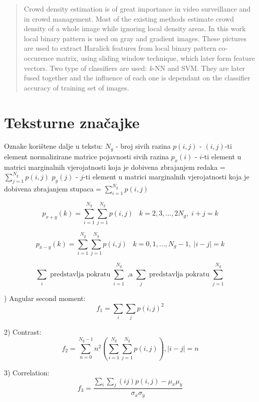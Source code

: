 \documentclass[times, utf8, zavrsni]{fer}
\begin{document}
\begin{abstract}
Crowd density estimation is of great importance in video surveillance and in crowd management. 
Most of the existing methods estimate crowd density of a whole image while ignoring local density areas.
In this work local binary pattern is used on gray and gradient images. These pictures are used to 
extract Haralick features from local binary pattern co-occurence matrix, using sliding window
technique, which later form feature vectors. Two type of classifiers are used: \textit{k}-NN and SVM.
They are later fused together and the influence of each one is dependant on the classifier accuracy of 
training set of images.

\end{abstract}

\appendix

\chapter{Teksturne značajke}

Oznake korištene dalje u tekstu:
\bigbreak
\(N_g\) - broj sivih razina
\(p(i,j)\) - \((i,j)\)-ti element normalizirane matrice pojavnosti sivih razina
\bigbreak
\(p_x(i)\) - \(i\)-ti element u matrici marginalnih vjerojatnosti koja je dobivena 
zbrajanjem redaka = \(\sum_{j=1}^{N_g}p(i,j)\)
\bigbreak
\(p_y(j)\) - \(j\)-ti element u matrici marginalnih vjerojatnosti koja je dobivena 
zbrajanjem stupaca = \(\sum_{i=1}^{N_g}p(i,j)\)

\[
p_{x+y}(k)=\sum_{i=1}^{N_g} \sum_{j=1}^{N_g} p(i,j) \;\;\; k=2,3,...,2N_g, \; i+j=k
\]

\[
p_{x-y}(k)=\sum_{i=1}^{N_g} \sum_{j=1}^{N_g} p(i,j) \;\;\; k=0,1,...,N_g-1, \; \left|i-j\right|=k
\]

\[
\sum_i \; \textrm{predstavlja pokratu} \; \sum_{i=1}^{N_g} \; \textrm{,a} \;
\sum_{j} \; \textrm{predstavlja pokratu} \; \sum_{j=1}^{N_g}
\]

) Angular second moment:
\[
f_1 = \sum_{i}\sum_{j}p(i,j)^2
\]

2) Contrast:
\[
f_2 = \sum_{n=0}^{N_g-1}n^2 \left( \sum_{i=1}^{N_g}\sum_{j=1}^{N_g}p(i,j) \right), \left| i-j \right| = n
\]

3) Correlation:
\[
f_3 = \frac{\sum_i\sum_j\left(ij\right)p(i,j) - \mu_x\mu_y}{\sigma_x\sigma_y}
\]
\end{document}

